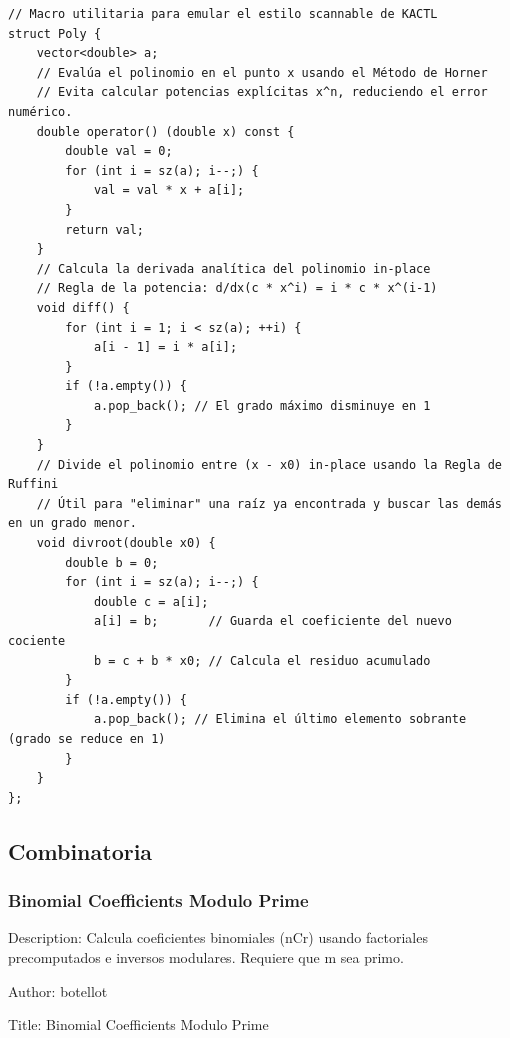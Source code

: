 \documentclass[10pt,landscape,twocolumn]{article}
\begin{document}
\begin{lstlisting}
// Macro utilitaria para emular el estilo scannable de KACTL
struct Poly {
    vector<double> a;
    // Evalúa el polinomio en el punto x usando el Método de Horner 
    // Evita calcular potencias explícitas x^n, reduciendo el error numérico.
    double operator() (double x) const {
        double val = 0; 
        for (int i = sz(a); i--;) {
            val = val * x + a[i]; 
        }
        return val; 
    }
    // Calcula la derivada analítica del polinomio in-place
    // Regla de la potencia: d/dx(c * x^i) = i * c * x^(i-1)
    void diff() {
        for (int i = 1; i < sz(a); ++i) {
            a[i - 1] = i * a[i];
        }
        if (!a.empty()) {
            a.pop_back(); // El grado máximo disminuye en 1 
        }
    }
    // Divide el polinomio entre (x - x0) in-place usando la Regla de Ruffini 
    // Útil para "eliminar" una raíz ya encontrada y buscar las demás en un grado menor.
    void divroot(double x0) {
        double b = 0;
        for (int i = sz(a); i--;) { 
            double c = a[i]; 
            a[i] = b;       // Guarda el coeficiente del nuevo cociente
            b = c + b * x0; // Calcula el residuo acumulado
        }
        if (!a.empty()) {
            a.pop_back(); // Elimina el último elemento sobrante (grado se reduce en 1)
        }
    }
};
\end{lstlisting}

\subsection{Combinatoria}

\subsubsection{Binomial Coefficients Modulo Prime}
\begin{flushleft}
\footnotesize\ttfamily
\par\noindent Description: Calcula coeficientes binomiales (nCr) usando factoriales precomputados e inversos modulares. Requiere que m sea primo.
\par\noindent Author: botellot
\par\noindent Title: Binomial Coefficients Modulo Prime
\end{flushleft}
\end{document}
